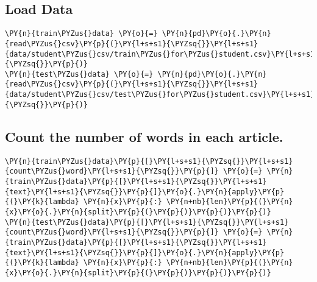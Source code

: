 \documentclass[../main.tex]{subfiles}
\begin{document}
    \subsection{Load Data}\label{load-data}

    \begin{tcolorbox}[breakable, size=fbox, boxrule=1pt, pad at break*=1mm,colback=cellbackground, colframe=cellborder]
\begin{Verbatim}[commandchars=\\\{\}]
\PY{n}{train\PYZus{}data} \PY{o}{=} \PY{n}{pd}\PY{o}{.}\PY{n}{read\PYZus{}csv}\PY{p}{(}\PY{l+s+s1}{\PYZsq{}}\PY{l+s+s1}{data/student\PYZus{}csv/train\PYZus{}for\PYZus{}student.csv}\PY{l+s+s1}{\PYZsq{}}\PY{p}{)}
\PY{n}{test\PYZus{}data} \PY{o}{=} \PY{n}{pd}\PY{o}{.}\PY{n}{read\PYZus{}csv}\PY{p}{(}\PY{l+s+s1}{\PYZsq{}}\PY{l+s+s1}{data/student\PYZus{}csv/test\PYZus{}for\PYZus{}student.csv}\PY{l+s+s1}{\PYZsq{}}\PY{p}{)}
\end{Verbatim}
\end{tcolorbox}

    \subsection{Count the number of words in each
article.}\label{count-the-number-of-words-in-each-article.}

    \begin{tcolorbox}[breakable, size=fbox, boxrule=1pt, pad at break*=1mm,colback=cellbackground, colframe=cellborder]
\begin{Verbatim}[commandchars=\\\{\}]
\PY{n}{train\PYZus{}data}\PY{p}{[}\PY{l+s+s1}{\PYZsq{}}\PY{l+s+s1}{count\PYZus{}word}\PY{l+s+s1}{\PYZsq{}}\PY{p}{]} \PY{o}{=} \PY{n}{train\PYZus{}data}\PY{p}{[}\PY{l+s+s1}{\PYZsq{}}\PY{l+s+s1}{text}\PY{l+s+s1}{\PYZsq{}}\PY{p}{]}\PY{o}{.}\PY{n}{apply}\PY{p}{(}\PY{k}{lambda} \PY{n}{x}\PY{p}{:} \PY{n+nb}{len}\PY{p}{(}\PY{n}{x}\PY{o}{.}\PY{n}{split}\PY{p}{(}\PY{p}{)}\PY{p}{)}\PY{p}{)}
\PY{n}{test\PYZus{}data}\PY{p}{[}\PY{l+s+s1}{\PYZsq{}}\PY{l+s+s1}{count\PYZus{}word}\PY{l+s+s1}{\PYZsq{}}\PY{p}{]} \PY{o}{=} \PY{n}{train\PYZus{}data}\PY{p}{[}\PY{l+s+s1}{\PYZsq{}}\PY{l+s+s1}{text}\PY{l+s+s1}{\PYZsq{}}\PY{p}{]}\PY{o}{.}\PY{n}{apply}\PY{p}{(}\PY{k}{lambda} \PY{n}{x}\PY{p}{:} \PY{n+nb}{len}\PY{p}{(}\PY{n}{x}\PY{o}{.}\PY{n}{split}\PY{p}{(}\PY{p}{)}\PY{p}{)}\PY{p}{)}
\end{Verbatim}
\end{tcolorbox}
\end{document}
